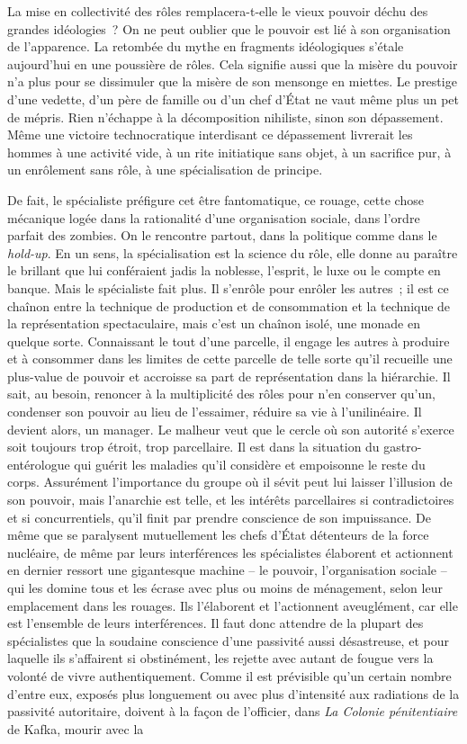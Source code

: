\documentclass[french,twoside]{book} %
\begin{document}
La mise en collectivité des rôles remplacera-t-elle le vieux pouvoir déchu des grandes idéologies ? On ne peut oublier que le pouvoir est lié à son organisation de l’apparence. La retombée du mythe en fragments idéologiques s’étale aujourd’hui en une poussière de rôles. Cela signifie aussi que la misère du pouvoir n’a plus pour se dissimuler que la misère de son mensonge en miettes. Le prestige d’une vedette, d’un père de famille ou d’un chef d’État ne vaut même plus un pet de mépris. Rien n’échappe à la décomposition nihiliste, sinon son dépassement. Même une victoire technocratique interdisant ce dépassement livrerait les hommes à une activité vide, à un rite initiatique sans objet, à un sacrifice pur, à un enrôlement sans rôle, à une spécialisation de principe.\par
De fait, le spécialiste préfigure cet être fantomatique, ce rouage, cette chose mécanique logée dans la rationalité d’une organisation sociale, dans l’ordre parfait des zombies. On le rencontre partout, dans la politique comme dans le \emph{hold-up}. En un sens, la spécialisation est la science du rôle, elle donne au paraître le brillant que lui conféraient jadis la noblesse, l’esprit, le luxe ou le compte en banque. Mais le spécialiste fait plus. Il s’enrôle pour enrôler les autres ; il est ce chaînon entre la technique de production et de consommation et la technique de la représentation spectaculaire, mais c’est un chaînon isolé, une monade en quelque sorte. Connaissant le tout d’une parcelle, il engage les autres à produire et à consommer dans les limites de cette parcelle de telle sorte qu’il recueille une plus-value de pouvoir et accroisse sa part de représentation dans la hiérarchie. Il sait, au besoin, renoncer à la multiplicité des rôles pour n’en conserver qu’un, condenser son pouvoir au lieu de l’essaimer, réduire sa vie à l’unilinéaire. Il devient alors, un manager. Le malheur veut que le cercle où son autorité s’exerce soit toujours trop étroit, trop parcellaire. Il est dans la situation du gastro-entérologue qui guérit les maladies qu’il considère et empoisonne le reste du corps. Assurément l’importance du groupe où il sévit peut lui laisser l’illusion de son pouvoir, mais l’anarchie est telle, et les intérêts parcellaires si contradictoires et si concurrentiels, qu’il finit par prendre conscience de son impuissance. De même que se paralysent mutuellement les chefs d’État détenteurs de la force nucléaire, de même par leurs interférences les spécialistes élaborent et actionnent en dernier ressort une gigantesque machine – le pouvoir, l’organisation sociale – qui les domine tous et les écrase avec plus ou moins de ménagement, selon leur emplacement dans les rouages. Ils l’élaborent et l’actionnent aveuglément, car elle est l’ensemble de leurs interférences. Il faut donc attendre de la plupart des spécialistes que la soudaine conscience d’une passivité aussi désastreuse, et pour laquelle ils s’affairent si obstinément, les rejette avec autant de fougue vers la volonté de vivre authentiquement. Comme il est prévisible qu’un certain nombre d’entre eux, exposés plus longuement ou avec plus d’intensité aux radiations de la passivité autoritaire, doivent à la façon de l’officier, dans \emph{La Colonie pénitentiaire} de Kafka, mourir avec la 
\end{document}
